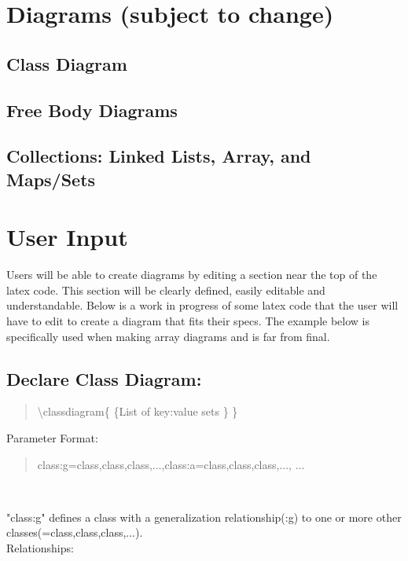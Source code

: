 \documentclass[10pt,a4paper,english]{article}
\begin{document}
\newpage
\thispagestyle{fancy}
\begin{flushleft}
\section*{Diagrams \small{(subject to change)}}
\subsection*{Class Diagram}
\subsection*{Free Body Diagrams}
\subsection*{Collections: Linked Lists, Array, and Maps/Sets }

\section{User Input}
Users will be able to create diagrams by editing a section near the top of the latex code.  This section will be clearly defined, easily editable and understandable.  Below is a work in progress of some latex code that the user will have to edit to create a diagram that fits their specs. The example below is specifically used when making array diagrams and is far from final.


\subsection*{Declare Class Diagram:}
\begin{quote}{\ttfamily \raggedright \noindent

{\textbackslash}classdiagram{\{} {\{}List of key:value sets {\}} {\}} ~\\

}\end{quote}

Parameter Format:~\\ \medskip
\begin{quote}{\ttfamily \raggedright \noindent
{ {class:g=class,class,class,...},{class:a=class,class,class,...}, ...}
}\end{quote}

~\\ \medskip

"class:g" defines a class with a generalization relationship(:g) to one or more other classes(=class,class,class,...). 
~\\ \medskip
Relationships: ~\\ \medskip


\end{flushleft}
\end{document}
